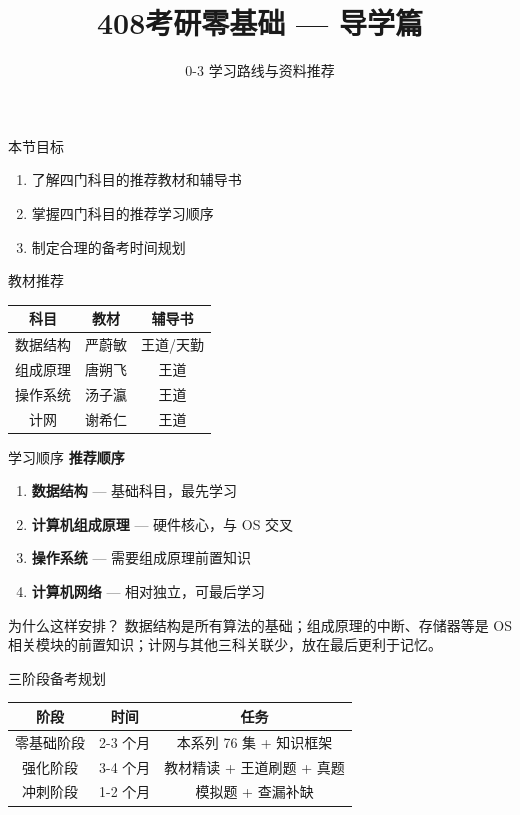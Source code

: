 \documentclass[10pt, aspectratio=169]{beamer}
\title{408考研零基础 --- 导学篇}
\subtitle{0-3 学习路线与资料推荐}
\author{}
\date{}
\begin{document}
\begin{frame}{本节目标}
    \begin{enumerate}
        \item 了解四门科目的推荐教材和辅导书
        \item 掌握四门科目的推荐学习顺序
        \item 制定合理的备考时间规划
    \end{enumerate}
\end{frame}

\begin{frame}{教材推荐}
    \begin{center}
    \begin{tabular}{|c|c|c|}
        \hline
        \textbf{科目} & \textbf{教材} & \textbf{辅导书} \\ \hline
        数据结构 & 严蔚敏 & 王道/天勤 \\ \hline
        组成原理 & 唐朔飞 & 王道 \\ \hline
        操作系统 & 汤子瀛 & 王道 \\ \hline
        计网 & 谢希仁 & 王道 \\ \hline
    \end{tabular}
    \end{center}
\end{frame}

\begin{frame}{学习顺序}
    \textbf{推荐顺序}
    \vspace{0.3em}
    \begin{enumerate}
        \item \textbf{数据结构} --- 基础科目，最先学习
        \item \textbf{计算机组成原理} --- 硬件核心，与 OS 交叉
        \item \textbf{操作系统} --- 需要组成原理前置知识
        \item \textbf{计算机网络} --- 相对独立，可最后学习
    \end{enumerate}
    \vspace{0.5em}
    \begin{block}{为什么这样安排？}
        数据结构是所有算法的基础；组成原理的中断、存储器等是 OS 相关模块的前置知识；计网与其他三科关联少，放在最后更利于记忆。
    \end{block}
\end{frame}

\begin{frame}{三阶段备考规划}
    \begin{center}
    \begin{tabular}{|c|c|c|}
        \hline
        \textbf{阶段} & \textbf{时间} & \textbf{任务} \\ \hline
        零基础阶段 & 2-3 个月 & 本系列 76 集 + 知识框架 \\ \hline
        强化阶段 & 3-4 个月 & 教材精读 + 王道刷题 + 真题 \\ \hline
        冲刺阶段 & 1-2 个月 & 模拟题 + 查漏补缺 \\ \hline
    \end{tabular}
    \end{center}
\end{frame}
\end{document}
